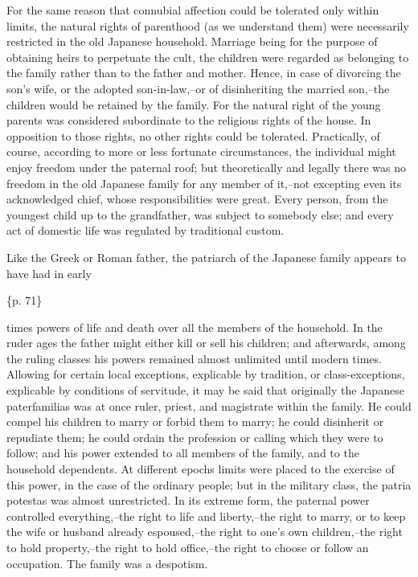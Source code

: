 For the same reason that connubial affection could be tolerated only within limits, the natural rights of parenthood (as we understand them) were necessarily restricted in the old Japanese household. Marriage being for the purpose of obtaining heirs to perpetuate the cult, the children were regarded as belonging to the family rather than to the father and mother. Hence, in case of divorcing the son's wife, or the adopted son-in-law,--or of disinheriting the married son,--the children would be retained by the family. For the natural right of the young parents was considered subordinate to the religious rights of the house. In opposition to those rights, no other rights could be tolerated. Practically, of course, according to more or less fortunate circumstances, the individual might enjoy freedom under the paternal roof; but theoretically and legally there was no freedom in the old Japanese family for any member of it,--not excepting even its acknowledged chief, whose responsibilities were great. Every person, from the youngest child up to the grandfather, was subject to somebody else; and every act of domestic life was regulated by traditional custom.

Like the Greek or Roman father, the patriarch of the Japanese family appears to have had in early

\{p. 71\}

times powers of life and death over all the members of the household. In the ruder ages the father might either kill or sell his children; and afterwards, among the ruling classes his powers remained almost unlimited until modern times. Allowing for certain local exceptions, explicable by tradition, or class-exceptions, explicable by conditions of servitude, it may be said that originally the Japanese paterfamilias was at once ruler, priest, and magistrate within the family. He could compel his children to marry or forbid them to marry; he could disinherit or repudiate them; he could ordain the profession or calling which they were to follow; and his power extended to all members of the family, and to the household dependents. At different epochs limits were placed to the exercise of this power, in the case of the ordinary people; but in the military class, the patria potestas was almost unrestricted. In its extreme form, the paternal power controlled everything,--the right to life and liberty,--the right to marry, or to keep the wife or husband already espoused,--the right to one's own children,--the right to hold property,--the right to hold office,--the right to choose or follow an occupation. The family was a despotism.

